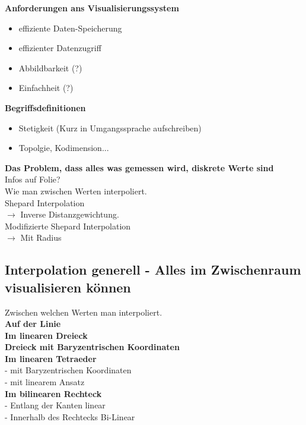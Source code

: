\documentclass{article}
\begin{document}
\noindent \textbf{Anforderungen ans Visualisierungssystem}
\begin{itemize}[noitemsep]
	\item effiziente Daten-Speicherung
	\item effizienter Datenzugriff
	\item Abbildbarkeit (?)
	\item Einfachheit (?)
\end{itemize}

\noindent \textbf{Begriffsdefinitionen}\\
\begin{itemize}[noitemsep]
	\item Stetigkeit (Kurz in Umgangssprache aufschreiben)
	\item Topolgie, Kodimension...
\end{itemize}

\noindent \textbf{Das Problem, dass alles was gemessen wird, diskrete Werte sind}\\
Infos auf Folie?\\
Wie man zwischen Werten interpoliert.\\

\noindent Shepard Interpolation\\
$\rightarrow$ Inverse Distanzgewichtung.\\

\noindent Modifizierte Shepard Interpolation\\
$\rightarrow$ Mit Radius

\subsection{Interpolation generell - Alles im Zwischenraum visualisieren können }
Zwischen welchen Werten man interpoliert.\\

\noindent \textbf{Auf der Linie}\\

\noindent \textbf{Im linearen Dreieck}\\

\noindent \textbf{Dreieck mit Baryzentrischen Koordinaten}\\

\noindent \textbf{Im linearen Tetraeder}\\
- mit Baryzentrischen Koordinaten\\
- mit linearem Ansatz\\

\noindent \textbf{Im bilinearen Rechteck}\\
- Entlang der Kanten linear\\
- Innerhalb des Rechtecks Bi-Linear\\
\end{document}
